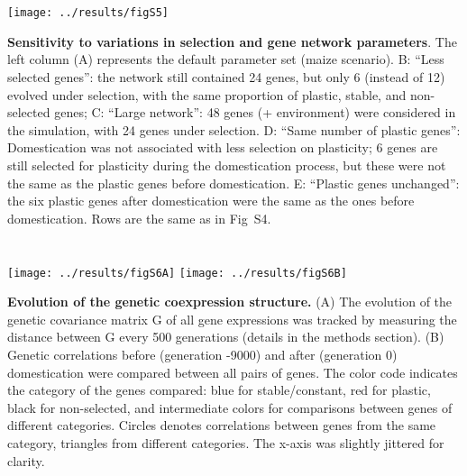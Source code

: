 \documentclass[10pt,a4paper]{article}
\begin{document}
\clearpage

\section{}

\begin{center}
\texttt{[image: ../results/figS5]}
\end{center}

\textbf{Sensitivity to variations in selection and gene network parameters}. The left column (A) represents the default parameter set (maize scenario). B: “Less selected genes”: the network still contained 24 genes, but only 6 (instead of 12) evolved under selection, with the same proportion of plastic, stable, and non-selected genes; C: “Large network”: 48 genes (+ environment) were considered in the simulation, with 24 genes under selection. D: “Same number of plastic genes”: Domestication was not associated with less selection on plasticity; 6 genes are still selected for plasticity during the domestication process, but these were not the same as the plastic genes before domestication. E: “Plastic genes unchanged”: the six plastic genes after domestication were the same as the ones before domestication. Rows are the same as in Fig\ S4. 

\clearpage

\section{}

\vspace{2cm}

\begin{center}
\texttt{[image: ../results/figS6A]}
\texttt{[image: ../results/figS6B]}
\end{center}

\vspace{2cm}

\textbf{Evolution of the genetic coexpression structure.} (A) The evolution of the genetic covariance matrix G of all gene expressions was tracked by measuring the distance between G every 500 generations (details in the methods section). (B) Genetic correlations before (generation -9000) and after (generation 0) domestication were compared between all pairs of genes. The color code indicates the category of the genes compared: blue for stable/constant, red for plastic, black for non-selected, and intermediate colors for comparisons between genes of different categories. Circles denotes correlations between genes from the same category, triangles from different categories. The x-axis was slightly jittered for clarity. 
\end{document}
